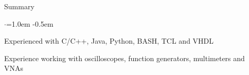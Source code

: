 \documentclass{resume} %
\begin{document}
	
	
	\begin{rSection}{Summary}
		\vspace {0.5em}
		\begin{list}{$\cdot$}{\leftmargin=1.0em}
			\itemsep -0.5em \vspace{-0.5em}
			\item Experienced with C/C++, Java, Python, BASH, TCL and VHDL			
			\item Experience working with oscilloscopes, function generators, multimeters and VNAs
		\end{list}
		\vspace{0.5em}
	\end{rSection}
	
	
\end{document}
